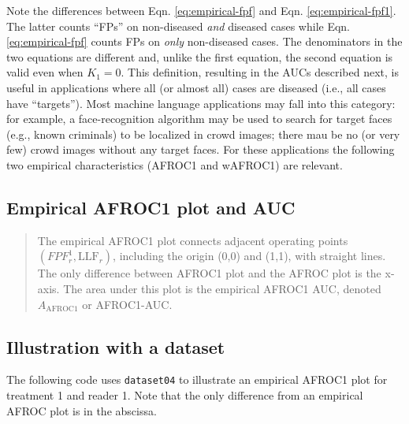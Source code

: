 \documentclass[
]{book}
\newenvironment{Shaded}{\begin{snugshade}}{\end{snugshade}}
\newcommand{\AttributeTok}[1]{\textcolor[rgb]{0.77,0.63,0.00}{#1}}
\newcommand{\DecValTok}[1]{\textcolor[rgb]{0.00,0.00,0.81}{#1}}
\newcommand{\FunctionTok}[1]{\textcolor[rgb]{0.00,0.00,0.00}{#1}}
\newcommand{\NormalTok}[1]{#1}
\newcommand{\OtherTok}[1]{\textcolor[rgb]{0.56,0.35,0.01}{#1}}
\newcommand{\SpecialCharTok}[1]{\textcolor[rgb]{0.00,0.00,0.00}{#1}}
\newcommand{\StringTok}[1]{\textcolor[rgb]{0.31,0.60,0.02}{#1}}
\begin{document}
Note the differences between Eqn. \eqref{eq:empirical-fpf} and Eqn. \eqref{eq:empirical-fpf1}. The latter counts ``FPs'' on non-diseased \emph{and} diseased cases while Eqn. \eqref{eq:empirical-fpf} counts FPs on \emph{only} non-diseased cases. The denominators in the two equations are different and, unlike the first equation, the second equation is valid even when \(K_1 = 0\). This definition, resulting in the AUCs described next, is useful in applications where all (or almost all) cases are diseased (i.e., all cases have ``targets''). Most machine language applications may fall into this category: for example, a face-recognition algorithm may be used to search for target faces (e.g., known criminals) to be localized in crowd images; there mau be no (or very few) crowd images without any target faces. For these applications the following two empirical characteristics (AFROC1 and wAFROC1) are relevant.

\hypertarget{empirical-definition-empirical-auc-afroc1}{%
\subsection{Empirical AFROC1 plot and AUC}\label{empirical-definition-empirical-auc-afroc1}}

\begin{quote}
The empirical AFROC1 plot connects adjacent operating points \(\left ( FPF_r^1, \text{LLF}_r \right )\), including the origin (0,0) and (1,1), with straight lines. The only difference between AFROC1 plot and the AFROC plot is the x-axis. The area under this plot is the empirical AFROC1 AUC, denoted \(A_{\text{AFROC1}}\) or AFROC1-AUC.
\end{quote}

\hypertarget{empirical-afroc1-plot-illustration}{%
\subsection{Illustration with a dataset}\label{empirical-afroc1-plot-illustration}}

The following code uses \texttt{dataset04} to illustrate an empirical AFROC1 plot for treatment 1 and reader 1. Note that the only difference from an empirical AFROC plot is in the abscissa.

\begin{Shaded}
\end{Shaded}
\end{document}
